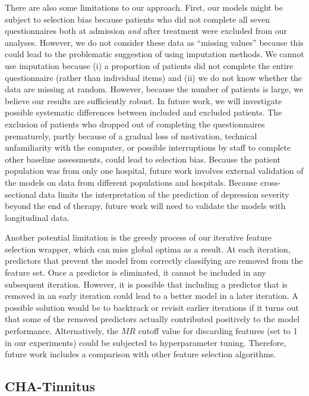 \documentclass[
  oneside]{book}
\begin{document}
There are also some limitations to our approach.
First, our models might be subject to selection bias because patients who did not complete all seven questionnaires both at admission \emph{and} after treatment were excluded from our analyses.
However, we do not consider these data as ``missing values'' because this could lead to the problematic suggestion of using imputation methods.
We cannot use imputation because (i) a proportion of patients did not complete the entire questionnaire (rather than individual items) and (ii) we do not know whether the data are missing at random.
However, because the number of patients is large, we believe our results are sufficiently robust.
In future work, we will investigate possible systematic differences between included and excluded patients.
The exclusion of patients who dropped out of completing the questionnaires prematurely, partly because of a gradual loss of motivation, technical unfamiliarity with the computer, or possible interruptions by staff to complete other baseline assessments, could lead to selection bias.
Because the patient population was from only one hospital, future work involves external validation of the models on data from different populations and hospitals.
Because cross-sectional data limits the interpretation of the prediction of depression severity beyond the end of therapy, future work will need to validate the models with longitudinal data.

Another potential limitation is the greedy process of our iterative feature selection wrapper, which can miss global optima as a result.
At each iteration, predictors that prevent the model from correctly classifying are removed from the feature set.
Once a predictor is eliminated, it cannot be included in any subsequent iteration.
However, it is possible that including a predictor that is removed in an early iteration could lead to a better model in a later iteration.
A possible solution would be to backtrack or revisit earlier iterations if it turns out that some of the removed predictors actually contributed positively to the model performance.
Alternatively, the \(MR\) cutoff value for discarding features (set to 1 in our experiments) could be subjected to hyperparameter tuning.
Therefore, future work includes a comparison with other feature selection algorithms.

\hypertarget{iml-discussion-tinnitus}{%
\subsection{CHA-Tinnitus}\label{iml-discussion-tinnitus}}
\end{document}

